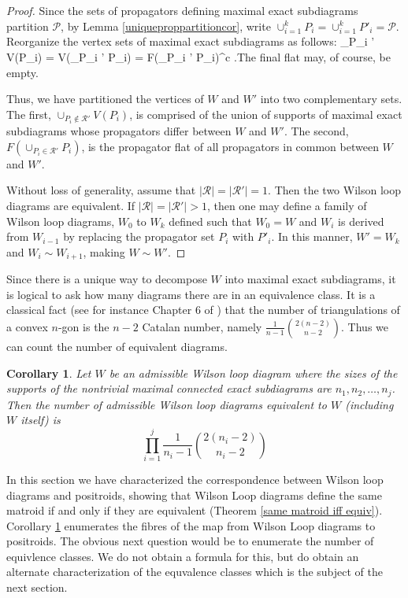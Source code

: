 \documentclass[11pt]{article}
\def\ba #1\ea{\begin{align} #1 \end{align}}
\newcommand{\cP}{\mathcal{P}}
\newtheorem{cor}[thm]{Corollary}
\theoremstyle{remark}
\theoremstyle{definition}
\begin{document}
\begin{proof}
Since the sets of propagators defining maximal exact subdiagrams partition $\cP$, by Lemma \ref{uniqueproppartitioncor}, write $\cup_{i = 1}^k P_i = \cup_{i = 1}^k P'_i = \cP$. Reorganize the vertex sets of maximal exact subdiagrams as follows: \ba \cup_{P_i \not \in {}'} V(P_i) = V(\cup_{P_i \not \in {}'} P_i)  = F(\cup_{P_i \in {}'} P_i)^c\label{vertexsets}\; .\ea The final flat may, of course, be empty.

Thus, we have partitioned the vertices of $W$ and $W'$ into two complementary sets. The first, $ \cup_{P_i \not \in \mathcal{R}'} V(P_i)$,  is comprised of the union of supports of maximal exact subdiagrams whose propagators differ between $W$ and $W'$. The second, $ F(\cup_{P_i \in \mathcal{R}'} P_i)$,  is the propagator flat of all propagators in common between $W$ and $W'$.

Without loss of generality, assume that $|\mathcal{R}| = |\mathcal{R}'| = 1$. Then the two Wilson loop diagrams are equivalent. If  $|\mathcal{R}| = |\mathcal{R}'| > 1$, then one may define a family of Wilson loop diagrams, $W_0$ to $W_k$ defined such that $W_0 = W$ and $W_i$ is derived from $W_{i-1}$ by replacing the propagator set $P_i$ with $P'_i$. In this manner, $W' = W_k$ and $W_i \sim W_{i+1}$, making $W \sim W'$.
\end{proof}

Since there is a unique way to decompose $W$ into maximal exact subdiagrams, it is logical to ask how many diagrams there are in an equivalence class. It is a classical fact (see for instance Chapter 6 of \cite{Stanley}) that the number of triangulations of a convex $n$-gon is the $n-2$ Catalan number, namely $\frac{1}{n-1}\binom{2(n-2)}{n-2}$.  Thus we can count the number of equivalent diagrams.

\begin{cor}\label{number of equiv diagrams}
  Let $W$ be an admissible Wilson loop diagram where the sizes of the supports of the nontrivial maximal connected exact subdiagrams are $n_1, n_2, \ldots, n_j$.  Then the number of admissible Wilson loop diagrams equivalent to $W$ (including $W$ itself) is
  \[
  \prod_{i=1}^{j} \frac{1}{n_i-1}\binom{2(n_i-2)}{n_i-2}
  \]
\end{cor}

In this section we have characterized the correspondence between Wilson loop diagrams and positroids, showing that Wilson Loop diagrams define the same matroid if and only if they are equivalent (Theorem \ref{same matroid iff equiv}). Corollary \ref{number of equiv diagrams} enumerates the fibres of the map from Wilson Loop diagrams to positroids.  The obvious next question would be to enumerate the number of equivlence classes.  We do not obtain a formula for this, but do obtain an alternate characterization of the equvalence classes which is the subject of the next section.
\end{document}

